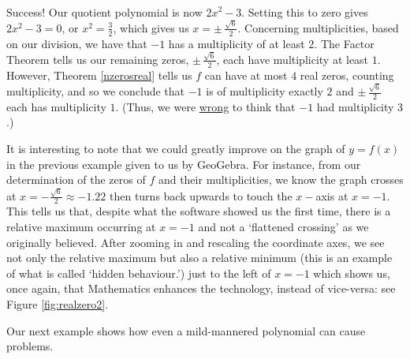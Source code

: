 {\begin{enumerate}
{\[\begin{array}{cccccccccc}
\end{array}\]

\setlength\arraycolsep{5pt}
\setlength\extrarowheight{0pt}

}
Success!  Our quotient polynomial is now $2x^2 - 3$.  Setting this to zero gives $2x^2 - 3 = 0$, or $x^2 = \frac{3}{2}$, which gives us $x = \pm \, \frac{\sqrt{6}}{2}$.  Concerning multiplicities, based on our division, we have that $-1$ has a multiplicity of at least $2$. The Factor Theorem tells us our remaining zeros, $\pm \, \frac{\sqrt{6}}{2}$, each have multiplicity at least $1$.  However, Theorem \ref{nzerosreal} tells us $f$ can have at most $4$ real zeros, counting multiplicity, and so we conclude that $-1$ is of multiplicity exactly $2$ and $\pm \, \frac{\sqrt{6}}{2}$ each has multiplicity $1$.  (Thus, we were \underline{wrong} to think that $-1$ had multiplicity $3$.) 

\end{enumerate}
}

It is interesting to note that we could greatly improve on the graph of $y=f(x)$ in the previous example given to us by GeoGebra. For instance, from our determination of the zeros of $f$ and their multiplicities, we know the graph crosses at $x=-\frac{\sqrt{6}}{2} \approx -1.22$ then turns back upwards to touch the $x-$axis at $x=-1$. This tells us that, despite what the software showed us the first time, there is a relative maximum occurring at $x = -1$ and not a `flattened crossing' as we originally believed.  After zooming in and rescaling the coordinate axes, we see not only the relative maximum but also a relative minimum (this is an example of what is called `hidden behaviour.') just to the left of $x = -1$ which shows us, once again, that Mathematics enhances the technology, instead of vice-versa: see Figure \ref{fig:realzero2}.


Our next example shows how even a mild-mannered polynomial can cause problems.


{

}

